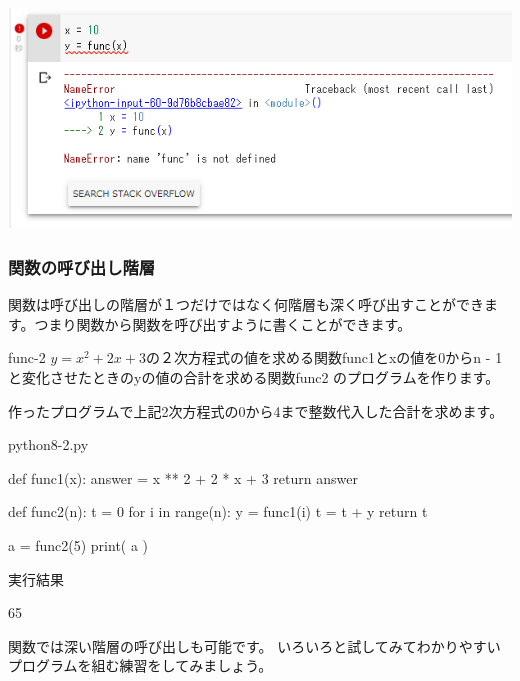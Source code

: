 \documentclass[11pt,a4paper,dvipdfmx,titlepage]{jsreport}
\begin{document}
\includegraphics[width=14cm]{images/colab26.png}

\subsubsection{関数の呼び出し階層}
関数は呼び出しの階層が１つだけではなく何階層も深く呼び出すことができます。つまり関数から関数を呼び出すように書くことができます。

\begin{pabox}{func-2}
$y = x^2 + 2 x + 3$の２次方程式の値を求める関数func1とxの値を0からn - 1と変化させたときのyの値の合計を求める関数func2
のプログラムを作ります。

作ったプログラムで上記2次方程式の0から4まで整数代入した合計を求めます。



\begin{codebox}{python8-2.py}
\begin{listing}{1}
def func1(x):
    answer = x ** 2 + 2 * x + 3
    return answer

def func2(n):
	t = 0
	for i in range(n):
		y = func1(i)
		t = t + y
	return t

a = func2(5)
print( a )
\end{listing}
実行結果
\begin{listing}{1}
65
\end{listing}
\end{codebox}
\end{pabox}

関数では深い階層の呼び出しも可能です。
いろいろと試してみてわかりやすいプログラムを組む練習をしてみましょう。
\newpage
\end{document}
